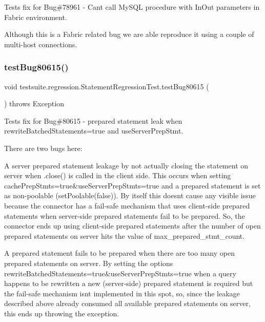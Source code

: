 Tests fix for Bug\#78961 -\/ Can\textquotesingle{}t call My\+S\+QL procedure with In\+Out parameters in Fabric environment.

Although this is a Fabric related bug we are able reproduce it using a couple of multi-\/host connections. \mbox{\label{classtestsuite_1_1regression_1_1_statement_regression_test_a338c926f02a641b1cabb27021e7e06e4}} 
\subsubsection{\texorpdfstring{test\+Bug80615()}{testBug80615()}}
{\footnotesize\ttfamily void testsuite.\+regression.\+Statement\+Regression\+Test.\+test\+Bug80615 (\begin{DoxyParamCaption}{ }\end{DoxyParamCaption}) throws Exception}

Tests fix for Bug\#80615 -\/ prepared statement leak when rewrite\+Batched\+Statements=true and use\+Server\+Prep\+Stmt.

There are two bugs here\+:
\begin{DoxyEnumerate}
\item A server prepared statement leakage by not actually closing the statement on server when .close() is called in the client side. This occurs when setting \textquotesingle{}cache\+Prep\+Stmts=true\&use\+Server\+Prep\+Stmts=true\textquotesingle{} and a prepared statement is set as non-\/poolable (\textquotesingle{}set\+Poolable(false)\textquotesingle{}). By itself this doesn\textquotesingle{}t cause any visible issue because the connector has a fail-\/safe mechanism that uses client-\/side prepared statements when server-\/side prepared statements fail to be prepared. So, the connector ends up using client-\/side prepared statements after the number of open prepared statements on server hits the value of \textquotesingle{}max\+\_\+prepared\+\_\+stmt\+\_\+count\textquotesingle{}.
\item A prepared statement fails to be prepared when there are too many open prepared statements on server. By setting the options \textquotesingle{}rewrite\+Batched\+Statements=true\&use\+Server\+Prep\+Stmts=true\textquotesingle{} when a query happens to be rewritten a new (server-\/side) prepared statement is required but the fail-\/safe mechanism isn\textquotesingle{}t implemented in this spot, so, since the leakage described above already consumed all available prepared statements on server, this ends up throwing the exception.
\end{DoxyEnumerate}

